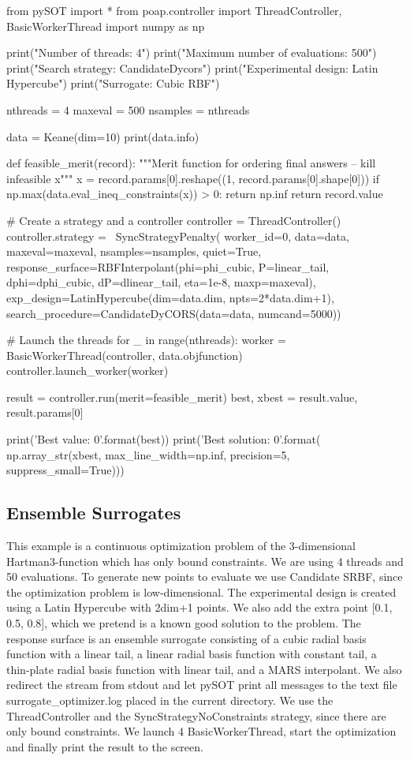 \documentclass[]{article}
\begin{document}
\begin{python}
from pySOT import *
from poap.controller import ThreadController, BasicWorkerThread
import numpy as np

print("Number of threads: 4")
print("Maximum number of evaluations: 500")
print("Search strategy: CandidateDycors")
print("Experimental design: Latin Hypercube")
print("Surrogate: Cubic RBF")

nthreads = 4
maxeval = 500
nsamples = nthreads

data = Keane(dim=10)
print(data.info)

def feasible_merit(record):
    """Merit function for ordering final answers -- kill infeasible x"""
    x = record.params[0].reshape((1, record.params[0].shape[0]))
    if np.max(data.eval_ineq_constraints(x)) > 0:
        return np.inf
    return record.value

# Create a strategy and a controller
controller = ThreadController()
controller.strategy = \
    SyncStrategyPenalty(
        worker_id=0, data=data,
        maxeval=maxeval, nsamples=nsamples, quiet=True,
        response_surface=RBFInterpolant(phi=phi_cubic, P=linear_tail,
                                        dphi=dphi_cubic, dP=dlinear_tail,
                                        eta=1e-8, maxp=maxeval),
        exp_design=LatinHypercube(dim=data.dim, npts=2*data.dim+1),
        search_procedure=CandidateDyCORS(data=data, numcand=5000))

# Launch the threads
for _ in range(nthreads):
    worker = BasicWorkerThread(controller, data.objfunction)
    controller.launch_worker(worker)

result = controller.run(merit=feasible_merit)
best, xbest = result.value, result.params[0]

print('Best value: {0}'.format(best))
print('Best solution: {0}'.format(
    np.array_str(xbest, max_line_width=np.inf,
                 precision=5, suppress_small=True)))
\end{python}

\subsection{Ensemble Surrogates}
This example is a continuous optimization problem of the 3-dimensional Hartman3-function which has only bound constraints. We are using 4 threads and 50 evaluations. To generate new points to evaluate we use Candidate SRBF, since the optimization problem is low-dimensional. The experimental design is created using a Latin Hypercube with 2dim+1 points. We also add the extra point [0.1, 0.5, 0.8], which we pretend is a known good solution to the problem. The response surface is an ensemble surrogate consisting of a cubic radial basis function with a linear tail, a linear radial basis function with constant tail, a thin-plate radial basis function with linear tail, and a MARS interpolant. We also redirect the stream from stdout and let pySOT print all messages to the text file surrogate\_optimizer.log placed in the current directory. We use the ThreadController and the SyncStrategyNoConstraints strategy, since there are only bound constraints. We launch 4 BasicWorkerThread, start the optimization and finally print the result to the screen.
\end{document}
